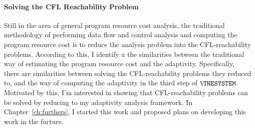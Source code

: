 \paragraph*{Solving the CFL Reachability Problem}
Still in the area of general program resource cost analysis,
the traditional methodology of performing data flow and control analysis and 
computing the program resource cost is
to reduce the analysis problem into the CFL-reachability problems.
According to this, 
I identify x
the similarities between the traditional way of estimating the program resource cost and 
the adaptivity.
Specifically, there are similarities between solving the CFL-reachability problems they reduced to,
 and the way of computing the adaptivity in 
the third step of $\THESYSTEM$.
 Motivated by this, 
 I'm interested in showing that
 CFL-reachability problems can be solved by reducing to my adaptivity analysis framework.
In Chapter~\ref{ch:furthers}, I started this work and proposed plans on developing this work in the furture.
